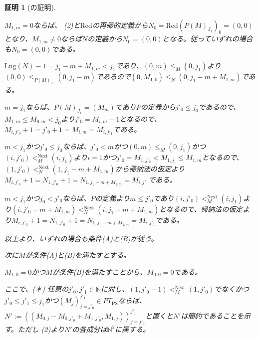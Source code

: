 \documentclass[dvipdfmx,uplatex]{jsarticle}
\theoremstyle{customnonumberbreakfortheorem}
\theoremstyle{customnonumberbreakforproof}
\newtheorem{hideableproof}{証明}
\begin{document}
\begin{hideableproof}[の証明]
\begin{indented}
\begin{indented}
\begin{indented}
\begin{indented}
\begin{indented}
\begin{indented}
							\item \(M_{1,m}=0\)ならば、 (2)と\(\textrm{Red}\)の再帰的定義から\(N_0 = \textrm{Red}(P(M)_{J_1})_0 = (0,0)\)となり、\(M_{1,m} \neq 0\)ならば\(N\)の定義から\(N_0 = (0,0)\)となる。従っていずれの場合も\(N_0 = (0,0)\)である。
							\item \(\textrm{Lng}(N) - 1 = j_1 - m + M_{1,m} < j_1\)であり、\((0,m) \leq_M (0,j_1)\)より\((0,0) \leq_{P(M)_{J_1}} (0,j_1-m)\)であるので\((0,M_{1,0}) \leq_N (0,j_1-m+M_{1,m})\)である。
							\item \(m = j_1\)ならば、\(P(M)_{J_1} = (M_m)\)であり\(P\)の定義から\(j'_0 \leq j_0\)であるので、\(M_{1,m} \leq M_{0,m} < j_0\)より\(j'_0 = M_{i,m}-1\)となるので、\(M_{i,j'_0}+1 = j'_0+1 = M_{i,m} = M_{i,j'_1}\)である。
							\item \(m < j_1\)かつ\(j'_0 \leq j_0\)ならば、\(j'_0 < m\)かつ\((0,m) \leq_M (0,j_1)\)かつ\((i,j'_0) <_M^{\textrm{Next}} (i,j_1)\)より\(i = 1\)かつ\(j'_0 = M_{1,j'_0} < M_{1,j_1} \leq M_{1,m}\)となるので、\((1,j'_0) <_N^{\textrm{Next}} (1,j_1 - m + M_{1,m})\)から帰納法の仮定より\(M_{i,j'_0}+1 = N_{1,j'_0} + 1 = N_{1,j_1 - m + M_{1,m}} = M_{i,j'_1}\)である。
							\item \(m < j_1\)かつ\(j_0 < j'_0\)ならば、\(P\)の定義より\(m \leq j'_0\)であり\((i,j'_0) <_M^{\textrm{Next}} (i,j_1)\)より\((i,j'_0-m+M_{1,m}) <_N^{\textrm{Next}} (i,j_1-m+M_{1,m})\)となるので、帰納法の仮定より\(M_{i,j'_0}+1 = N_{1,j'_0} + 1 = N_{1,j_1 - m + M_{1,m}} = M_{i,j'_1}\)である。
						\end{indented}
					\end{indented}
				\end{indented}
				\item 以上より、いずれの場合も条件(A)と(B)が従う。
			\end{indented}
			\item 次に\(M\)が条件(A)と(B)を満たすとする。
			\begin{indented}
				\item \(M_{1,0} = 0\)かつ\(M\)が条件(B)を満たすことから、\(M_{0,0} = 0\)である。
				\item ここで、(＊) 任意の\(j'_0, j'_1 \in \mathbb{N}\)に対し、\((1,j'_0-1) <_M^{\textrm{Next}} (1,j'_0)\)でなくかつ\(j'_0 \leq j'_1 \leq j_1\)かつ\((M_j)_{j=j'_0}^{j'_1} \in PT_{\textrm{PS}}\)ならば、\(N' := ((M_{0,j}-M_{0,j'_0}+M_{1,j'_0},M_{1,j}))_{j=j'_0}^{j'_1}\)と置くと\(N'\)は簡約であることを示す。ただし (2)より\(N'\)の各成分は\(\mathbb{N}^2\)に属する。
				\begin{indented}

\end{indented}
\end{indented}
\end{indented}
\end{indented}
\end{hideableproof}
\end{document}
